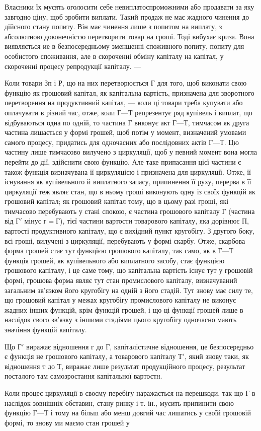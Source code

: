 \parcont{}  %
Власники їх мусять оголосити себе невиплатоспроможними або продавати
за яку завгодно ціну, щоб зробити виплати. Такий продаж не має
жадного чинення до дійсного стану попиту. Він має чинення лише
з попитом на виплату, з абсолютною доконечністю перетворити товар на
гроші. Тоді вибухає криза. Вона виявляється ие в безпосередньому
зменшенні споживного попиту, попиту для особистого споживання, але
в скороченні обміну капіталу на капітал, у скороченні процесу репродукції
капіталу. —

Коли товари Зп і Р, що на них перетворюється Г для того, щоб
виконати свою функцію як грошовий капітал, як капітальна
вартість, призначена для зворотного перетворення на продуктивний
капітал, — коли ці товари треба купувати або оплачувати в різний час,
отже, коли $Г — Т$ репрезентує ряд купівель і виплат, що відбуваються
одна по одній, то частина Г виконує акт $Г — Т$, тимчасом як друга частина
лишається у формі грошей, щоб потім у момент, визначений умовами
самого процесу, придатись для одночасних або послідовних актів $Г — Т$.
Цю частину лише тимчасово вилучено з циркуляції, щоб у певний
момент вона могла перейти до дії, здійснити свою функцію. Але таке
припасання цієї частини є також функція визначувана її циркуляцією
і призначена для циркуляції. Отже, її існування як купівельного й виплатного
запасу, припинення її руху, перерва в її циркуляції теж являє стан,
що в ньому гроші виконують одну із своїх функцій як грошовий капітал; як
грошовий капітал тому, що в цьому разі гроші, які тимчасово перебувають
у стані спокою, є частина грошового капіталу Г (частина від
$Г'$ мінус $г = Г$), тієї частини вартости товарового капіталу, яка дорівнює П,
вартості продуктивного капіталу, що є вихідний пункт кругобігу. З другого
боку, всі гроші, вилучені з циркуляції, перебувають у формі скарбу.
Отже, скарбова форма грошей стає тут функцією грошового капіталу, так
само, як в $Г — Т$ функція грошей, як купівельного або виплатного засобу, стає
функцією грошового капіталу, і це саме тому, що капітальна вартість
існує тут у грошовій формі, грошова форма являє тут стан промислового
капіталу, визначуваний загальним зв’язком його кругобігу на одній з його
стадій. Тут знову має силу те, що грошовий капітал у межах кругобігу
промислового капіталу не виконує жадних інших функцій, крім функцій
грошей, і що ці функції грошей лише в наслідок свого зв’язку
з іншими стадіями цього кругобігу одночасно мають значіння функцій
капіталу.

Що $Г'$ виражає відношення г до Г, капіталістичне відношення, це
безпосередньо є функція не грошового капіталу, а товарового капіталу $Т'$,
який знову таки, як відношення т до Т, виражає лише результат продукційного
процесу, результат посталого там самозростання капітальної
вартостн.

Коли процес циркуляції в своєму перебігу наражається на перешкоди,
так що Г в наслідок зовнішніх обставин, стану ринку і т. ін., мусить
припинити свою функцію $Г — Т$ і тому на більш або менш довгий час
лишатись у своїй грошовій формі, то знову ми маємо стан грошей у
\parbreak{}  %
